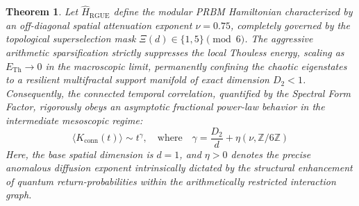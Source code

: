 \documentclass[aps,prl,preprint,superscriptaddress,floatfix]{revtex4-2}
\newtheorem{theorem}{Theorem}[section]
\newcommand{\Zmod}{\mathbb{Z}/6\mathbb{Z}}
\begin{document}
\begin{theorem}
\label{thm:anomalous_diffusion_sff}
Let $\hat{H}_{\text{RGUE}}$ define the modular PRBM Hamiltonian characterized by an off-diagonal spatial attenuation exponent $\nu = 0.75$, completely governed by the topological superselection mask $\Xi(d) \in \{1,5\} \pmod 6$. The aggressive arithmetic sparsification strictly suppresses the local Thouless energy, scaling as $E_{\text{Th}} \to 0$ in the macroscopic limit, permanently confining the chaotic eigenstates to a resilient multifractal support manifold of exact dimension $D_2 < 1$. Consequently, the connected temporal correlation, quantified by the Spectral Form Factor, rigorously obeys an asymptotic fractional power-law behavior in the intermediate mesoscopic regime:
\begin{equation}
\langle K_{\text{conn}}(t) \rangle \sim t^{\gamma}, \quad \text{where} \quad \gamma = \frac{D_2}{d} + \eta(\nu, \Zmod)
\end{equation}
Here, the base spatial dimension is $d=1$, and $\eta > 0$ denotes the precise anomalous diffusion exponent intrinsically dictated by the structural enhancement of quantum return-probabilities within the arithmetically restricted interaction graph.
\end{theorem}
\end{document}

